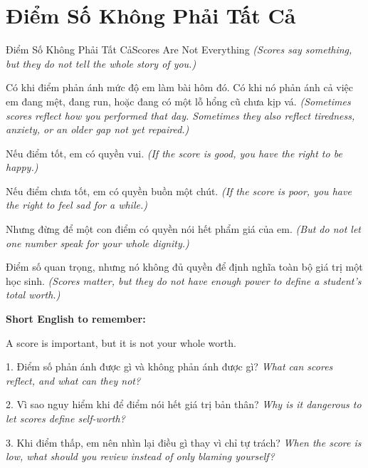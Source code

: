 \section{Điểm Số Không Phải Tất Cả}
\begin{truyen}{Điểm Số Không Phải Tất Cả}{Scores Are Not Everything}
\textit{(Scores say something, but they do not tell the whole story of you.)}

Có khi điểm phản ánh mức độ em làm bài hôm đó. Có khi nó phản ánh cả việc em đang mệt, đang run, hoặc đang có một lỗ hổng cũ chưa kịp vá.
\textit{(Sometimes scores reflect how you performed that day. Sometimes they also reflect tiredness, anxiety, or an older gap not yet repaired.)}

Nếu điểm tốt, em có quyền vui.
\textit{(If the score is good, you have the right to be happy.)}

Nếu điểm chưa tốt, em có quyền buồn một chút.
\textit{(If the score is poor, you have the right to feel sad for a while.)}

Nhưng đừng để một con điểm có quyền nói hết phẩm giá của em.
\textit{(But do not let one number speak for your whole dignity.)}
\end{truyen}

\begin{baihoc}
Điểm số quan trọng, nhưng nó không đủ quyền để định nghĩa toàn bộ giá trị một học sinh.
\textit{(Scores matter, but they do not have enough power to define a student's total worth.)}
\end{baihoc}

\begin{ghinhoanh}
\textbf{Short English to remember:}

A score is important, but it is not your whole worth.

\end{ghinhoanh}

\begin{tuhocnhanh}
1. Điểm số phản ánh được gì và không phản ánh được gì? \textit{What can scores reflect, and what can they not?}

2. Vì sao nguy hiểm khi để điểm nói hết giá trị bản thân? \textit{Why is it dangerous to let scores define self-worth?}

3. Khi điểm thấp, em nên nhìn lại điều gì thay vì chỉ tự trách? \textit{When the score is low, what should you review instead of only blaming yourself?}
\end{tuhocnhanh}
\ngancach

